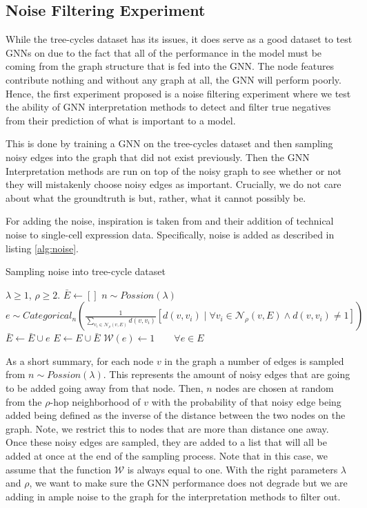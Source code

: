 \subsection{Noise Filtering Experiment}
While the tree-cycles dataset has its issues, it does serve as a good dataset to test GNNs on due to the fact that all of the performance in the model must be coming from the graph structure that is fed into the GNN. The node features contribute nothing and without any graph at all, the GNN will perform poorly. Hence, the first experiment proposed is a noise filtering experiment where we test the ability of GNN interpretation methods to detect and filter true negatives from their prediction of what is important to a model.

This is done by training a GNN on the tree-cycles dataset and then sampling noisy edges into the graph that did not exist previously. Then the GNN Interpretation methods are run on top of the noisy graph to see whether or not they will mistakenly choose noisy edges as important. Crucially, we do not care about what the groundtruth is but, rather, what it cannot possibly be. 

For adding the noise, inspiration is taken from \cite{dibaeinia_sergio_2020} and their addition of technical noise to single-cell expression data. Specifically, noise is added as described in listing \ref{alg:noise}.
\begin{algorithm}[h]
	\centering
	\caption{Sampling noise into tree-cycle dataset}
	\label{alg:noise}
	\begin{algorithmic}
		\Require $\lambda \geq 1$, $\rho \geq 2$.
		\State $\bar{E} \gets []$
			\State $n \sim Possion(\lambda)$
			\State $e \sim Categorical_n\left(\frac{1}{\sum_{v_i \in \mathcal{N}_{\rho}(v, E)}d(v, v_i)}[d(v, v_i) \mid \forall v_i \in \mathcal{N}_{\rho}(v, E) \wedge d(v, v_i) \neq 1] \right)$
			\State $\bar{E} \gets \bar{E} \cup e$
		\EndFor
		\State $E \gets E \cup \bar{E}$
		\State $\mathcal{W}(e) \gets 1 \quad\quad \forall e \in E$
	\end{algorithmic}
\end{algorithm}
As a short summary, for each node $v$ in the graph a number of edges is sampled from $n \sim Possion(\lambda)$. This represents the amount of noisy edges that are going to be added going away from that node. Then, $n$ nodes are chosen at random from the $\rho$-hop neighborhood of $v$ with the probability of that noisy edge being added being defined as the inverse of the distance between the two nodes on the graph. Note, we restrict this to nodes that are more than distance one away. Once these noisy edges are sampled, they are added to a list that will all be added at once at the end of the sampling process. Note that in this case, we assume that the function $\mathcal{W}$ is always equal to one. With the right parameters $\lambda$ and $\rho$, we want to make sure the GNN performance does not degrade but we are adding in ample noise to the graph for the interpretation methods to filter out.

